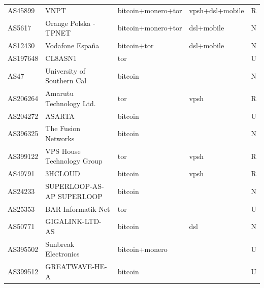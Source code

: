 \begin{longtable}{lllll}
AS45899 & VNPT & bitcoin+monero+tor & vpsh+dsl+mobile & R \\ 
AS5617 & Orange Polska - TPNET & bitcoin+monero+tor & dsl+mobile & N \\ 
AS12430 & Vodafone España & bitcoin+tor & dsl+mobile & N \\ 
AS197648 & CL8ASN1 & tor &  & U \\ 
AS47 & University of Southern Cal & bitcoin &  & N \\ 
AS206264 & Amarutu Technology Ltd. & tor & vpsh & R \\ 
AS204272 & ASARTA & bitcoin &  & U \\ 
AS396325 & The Fusion Networks & bitcoin &  & N \\ 
AS399122 & VPS House Technology Group & tor & vpsh & R \\ 
AS49791 & 3HCLOUD & bitcoin & vpsh & R \\ 
AS24233 & SUPERLOOP-AS-AP SUPERLOOP  & bitcoin &  & N \\ 
AS25353 & BAR Informatik Net & tor &  & U \\ 
AS50771 & GIGALINK-LTD-AS & bitcoin & dsl & N \\ 
AS395502 & Sunbreak Electronics & bitcoin+monero &  & U \\ 
AS399512 & GREATWAVE-HE-A & bitcoin &  & U \\ 
\bottomrule
\end{longtable}
\endgroup
